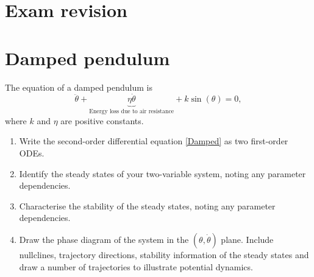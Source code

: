 \documentclass[]{article}
\newcommand{\bb}{\begin{equation}}
\newcommand{\ee}{\end{equation}}
\newcommand{\eqn}[1]{equation \eqref{#1}}
\begin{document}
\section*{Exam revision}
\section{Damped pendulum}
The equation of a damped pendulum is
\bb
\ddot{\theta}+\underbrace{\eta \dot{\theta}}_{\textrm{Energy loss due to air resistance}}+k\sin(\theta)=0,\label{Damped}
\ee
where $k$ and $\eta$ are positive constants.
\begin{enumerate}
\item Write the second-order differential \eqn{Damped} as two first-order ODEs.
\item Identify the steady states of your two-variable system, noting any parameter dependencies.
\item Characterise the stability of the steady states, noting any parameter dependencies.
\item Draw the phase diagram of the system in the $(\theta,\dot{\theta})$ plane. Include nullclines, trajectory directions, stability information of the steady states and draw a number of trajectories to illustrate potential dynamics.
\end{enumerate}
\end{document}
